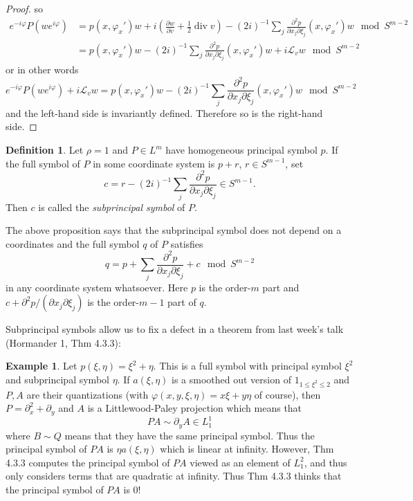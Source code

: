 \documentclass[reqno,12pt,letterpaper]{amsart}
\newcommand{\dfn}[1]{\emph{#1}\index{#1}}
\theoremstyle{definition}
\newtheorem{definition}[theorem]{Definition}
\newtheorem{example}[theorem]{Example}
\begin{document}
\begin{proof}
so
\begin{align*}e^{-i\varphi} P(we^{i\varphi}) &= p(x, \varphi_x')w + i\left(\frac{\partial w}{\partial v} + \frac{1}{2} \operatorname{div} v\right) - (2i)^{-1}\sum_{j} \frac{\partial^2 p}{\partial x_j \partial \xi_j}(x, \varphi_x')w \mod S^{m - 2}\\
&= p(x, \varphi_x')w - (2i)^{-1}\sum_j \frac{\partial^2 p}{\partial x_j \partial \xi_j}(x, \varphi_x')w + i\mathcal L_vw \mod S^{m - 2}
\end{align*}
or in other words
$$e^{-i\varphi} P(we^{i\varphi}) + i\mathcal L_vw = p(x, \varphi_x')w - (2i)^{-1}\sum_j \frac{\partial^2 p}{\partial x_j \partial \xi_j}(x, \varphi_x')w \mod S^{m - 2}$$
and the left-hand side is invariantly defined.
Therefore so is the right-hand side.
\end{proof}

\begin{definition}
Let $\rho = 1$ and $P \in L^m$ have homogeneous principal symbol $p$.
If the full symbol of $P$ in some coordinate system is $p + r$, $r \in S^{m - 1}$, set
$$c = r - (2i)^{-1} \sum_j \frac{\partial^2 p}{\partial x_j \partial \xi_j} \in S^{m - 1}.$$
Then $c$ is called the \dfn{subprincipal symbol} of $P$.
\end{definition}

The above proposition says that the subprincipal symbol does not depend on a coordinates and the full symbol $q$ of $P$ satisfies
$$q = p + \sum_j \frac{\partial^2 p}{\partial x_j \partial \xi_j} + c \mod S^{m - 2}$$
in any coordinate system whatsoever.
Here $p$ is the order-$m$ part and $c + \partial^2p/(\partial x_j \partial \xi_j)$ is the order-$m-1$ part of $q$.

Subprincipal symbols allow us to fix a defect in a theorem from last week's talk (Hormander 1, Thm 4.3.3):

\begin{example}
Let $p(\xi, \eta) = \xi^2 + \eta$.
This is a full symbol with principal symbol $\xi^2$ and subprincipal symbol $\eta$.
If $a(\xi, \eta)$ is a smoothed out version of $1_{1 \leq \xi^2 \leq 2}$ and $P,A$ are their quantizations (with $\varphi(x, y, \xi, \eta) = x\xi + y\eta$ of course), then $P = \partial_x^2 + \partial_y$ and $A$ is a Littlewood-Paley projection which means that
$$PA \sim \partial_y A \in L^1_1$$
where $B \sim Q$ means that they have the same principal symbol.
Thus the principal symbol of $PA$ is $\eta a(\xi, \eta)$ which is linear at infinity.
However, Thm 4.3.3 computes the principal symbol of $PA$ viewed as an element of $L^2_1$, and thus only considers terms that are quadratic at infinity.
Thus Thm 4.3.3 thinks that the principal symbol of $PA$ is $0$!
\end{example}
\end{document}
